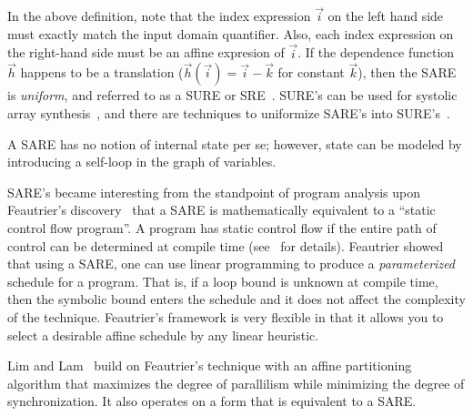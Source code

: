 In the above definition, note that the index expression ${\vec i}$ on
the left hand side must exactly match the input domain quantifier.
Also, each index expression on the right-hand side must be an affine
expresion of ${\vec i}$.  If the dependence function ${\vec h}$
happens to be a translation (${\vec h}({\vec i}) = {\vec i} - {\vec
k}$ for constant ${\vec k}$), then the SARE is {\it uniform}, and
referred to as a SURE or SRE~\cite{Karp67}. SURE's can be used for
systolic array synthesis~\cite{Quinton84}, and there are techniques to
uniformize SARE's into SURE's~\cite{Manjun00}.

A SARE has no notion of internal state per se; however, state can be
modeled by introducing a self-loop in the graph of variables.

SARE's became interesting from the standpoint of program analysis upon
Feautrier's discovery~\cite{Feautrier92i,Feautrier92ii} that a SARE is
mathematically equivalent to a ``static control flow program''.  A
program has static control flow if the entire path of control can be
determined at compile time (see~\cite{Feautrier92i,FV00} for details).
Feautrier showed that using a SARE, one can use linear programming to
produce a {\it parameterized} schedule for a program.  That is, if a
loop bound is unknown at compile time, then the symbolic bound enters
the schedule and it does not affect the complexity of the technique.
Feautrier's framework is very flexible in that it allows you to select
a desirable affine schedule by any linear heuristic.

Lim and Lam~\cite{Lim01} build on Feautrier's technique with an affine
partitioning algorithm that maximizes the degree of parallilism while
minimizing the degree of synchronization.  It also operates on a form
that is equivalent to a SARE.
